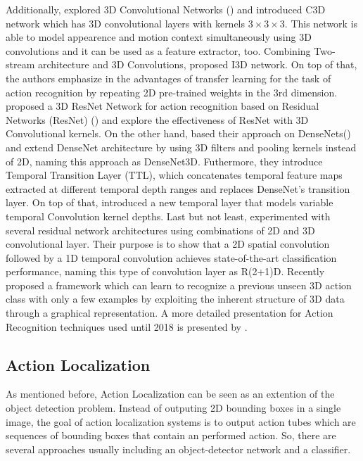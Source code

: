 Additionally, \cite{Tran2014LearningSF} explored 3D Convolutional Networks (\cite{pmid:22392705}) and introduced C3D network which  has
3D convolutional layers with kernels $ 3 \times 3 \times 3$.
This network is able to  model appearence and motion context simultaneously using 3D convolutions and it can be used as a feature extractor, too.
Combining Two-stream architecture and 3D Convolutions, \cite{DBLP:journals/corr/CarreiraZ17} proposed
I3D network. On top of that, the authors emphasize in the advantages of transfer learning for the task of action recognition by repeating 2D pre-trained weights
in the 3rd dimension. \cite{DBLP:journals/corr/abs-1708-07632} proposed a 3D ResNet Network for action recognition based on Residual Networks (ResNet)
(\cite{DBLP:journals/corr/HeZRS15}) and explore the effectiveness of ResNet with 3D Convolutional kernels.
On the other hand, \cite{DBLP:journals/corr/abs-1711-08200}  based their approach on DenseNets(\cite{DBLP:journals/corr/HuangLW16a}) and extend
DenseNet architecture by using 3D filters and pooling kernels instead of 2D, naming this approach as DenseNet3D. Futhermore, they introduce
Temporal Transition Layer (TTL), which concatenates temporal feature maps extracted at different temporal depth ranges and replaces DenseNet's
transition layer. On top of that, \cite{DBLP:DibaFSKAYG18} introduced  a new temporal layer that models variable  temporal Convolution kernel depths.
Last but not least, \cite{DBLP:journals/corr/abs-1711-11248} experimented with several residual network architectures using combinations of 2D and 3D convolutional layer. Their purpose is
to show that a 2D spatial convolution followed by a 1D temporal convolution achieves state-of-the-art classification performance, naming
this type of convolution layer as R(2+1)D. 
Recently \cite{Guo_2018_ECCV} proposed a framework which can learn to recognize a previous unseen 3D action class with only a few examples
by exploiting the inherent structure of 3D data through a graphical representation. A more detailed presentation for Action Recognition techniques used until 2018 is presented by
\cite{DBLP:journals/corr/abs-1806-11230}.

\subsection{Action Localization}

As mentioned before, Action Localization can be seen as an extention of the object detection problem. Instead of outputing 2D bounding
boxes in a single image, the goal of action localization systems is to output action tubes which are sequences of bounding boxes that
contain an performed action. So, there are several approaches usually including an object-detector network  and a classifier. \par


